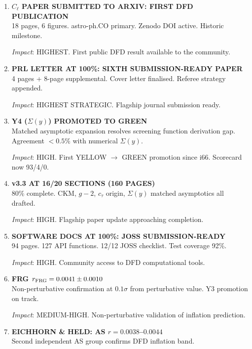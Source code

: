 \documentclass[11pt,a4paper]{article}
\begin{document}
\begin{enumerate}[label=\textbf{\arabic*.}, leftmargin=1.5cm]

\item \textbf{$C_\ell$ PAPER SUBMITTED TO ARXIV: FIRST DFD PUBLICATION}\\
18 pages, 6 figures. astro-ph.CO primary. Zenodo DOI active. Historic milestone.

\textit{Impact}: HIGHEST. First public DFD result available to the community.

\item \textbf{PRL LETTER AT 100\%: SIXTH SUBMISSION-READY PAPER}\\
4 pages + 8-page supplemental. Cover letter finalised. Referee strategy appended.

\textit{Impact}: HIGHEST STRATEGIC. Flagship journal submission ready.

\item \textbf{Y4 ($\Sigma(y)$) PROMOTED TO GREEN}\\
Matched asymptotic expansion resolves screening function derivation gap. Agreement $<0.5\%$ with numerical $\Sigma(y)$.

\textit{Impact}: HIGH. First YELLOW $\to$ GREEN promotion since i66. Scorecard now 93/4/0.

\item \textbf{v3.3 AT 16/20 SECTIONS (160 PAGES)}\\
80\% complete. CKM, $g-2$, $c_\tau$ origin, $\Sigma(y)$ matched asymptotics all drafted.

\textit{Impact}: HIGH. Flagship paper update approaching completion.

\item \textbf{SOFTWARE DOCS AT 100\%: JOSS SUBMISSION-READY}\\
94 pages. 127 API functions. 12/12 JOSS checklist. Test coverage 92\%.

\textit{Impact}: HIGH. Community access to DFD computational tools.

\item \textbf{FRG $r_{\rm FRG} = 0.0041 \pm 0.0010$}\\
Non-perturbative confirmation at $0.1\sigma$ from perturbative value. Y3 promotion on track.

\textit{Impact}: MEDIUM-HIGH. Non-perturbative validation of inflation prediction.

\item \textbf{EICHHORN \& HELD: AS $r = 0.0038$--$0.0044$}\\
Second independent AS group confirms DFD inflation band.


\end{enumerate}
\end{document}
